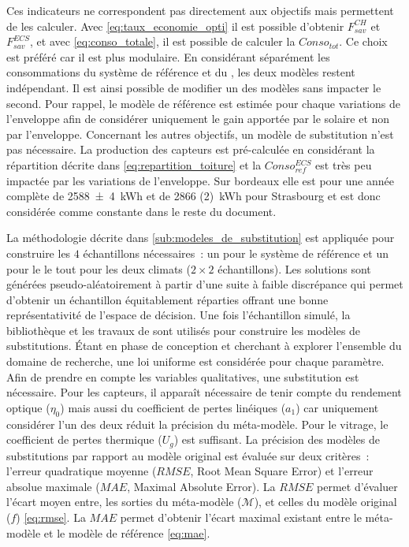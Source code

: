 Ces indicateurs ne correspondent pas directement aux objectifs mais permettent de les calculer.
Avec \eqref{eq:taux_economie_opti} il est possible d’obtenir $F_{sav}^{CH}$ et $F_{sav}^{ECS}$,
et avec \eqref{eq:conso_totale}, il est possible de calculer la $Conso_{tot}$.
Ce choix est préféré car il est plus modulaire. En considérant séparément les consommations
du système de référence et du , les deux modèles restent indépendant. Il est
ainsi possible de modifier un des modèles sans impacter le second. Pour rappel, le
modèle de référence est estimée pour chaque variations de l’enveloppe afin de considérer
uniquement le gain apportée par le solaire et non par l’enveloppe.
Concernant les autres objectifs, un modèle de substitution n’est pas nécessaire. La
production des capteurs  est pré-calculée en considérant la répartition décrite
dans \eqref{eq:repartition_toiture} et la $Conso_{ref}^{ECS}$ est très peu impactée par
les variations de l’enveloppe. Sur bordeaux elle est pour une année complète de \SI{2588(4)}{kWh}
et de \SI{2866 (2)}{kWh} pour Strasbourg et est donc considérée comme constante
dans le reste du document.

La méthodologie décrite dans \ref{sub:modeles_de_substitution} est appliquée pour
construire les $4$ échantillons nécessaires~: un pour le système de référence et un pour
le  le tout pour les deux climats ($2 \times 2$ échantillons). Les solutions sont
générées pseudo-aléatoirement à partir d’une suite à faible discrépance qui permet
d’obtenir un échantillon équitablement réparties offrant une bonne représentativité de
l’espace de décision. Une fois l’échantillon simulé, la bibliothèque
 et les travaux de \textcite{Rania2013}
sont utilisés pour construire les modèles de substitutions. Étant en phase de conception
et cherchant à explorer l’ensemble du domaine de recherche, une loi uniforme est
considérée pour chaque paramètre. Afin de prendre en compte les variables qualitatives,
une substitution est nécessaire. Pour les capteurs, il apparaît nécessaire de tenir compte
du rendement optique ($\eta_{0}$) mais aussi du coefficient de pertes linéiques ($a_{1}$)
car uniquement considérer l’un des deux réduit la précision du méta-modèle. Pour le
vitrage, le coefficient de pertes thermique ($U_{g}$) est suffisant. La précision des
modèles de substitutions par rapport au modèle original est évaluée sur deux critères~:
l’erreur quadratique moyenne ($RMSE$, Root Mean Square Error) et l’erreur absolue maximale
($MAE$, Maximal Absolute Error). La $RMSE$ permet d’évaluer l’écart moyen entre, les
sorties du méta-modèle ($\mathcal{M}$), et celles du modèle original ($f$)
\eqref{eq:rmse}. La $MAE$ permet d’obtenir l’écart maximal existant entre le méta-modèle
et le modèle de référence \eqref{eq:mae}.

